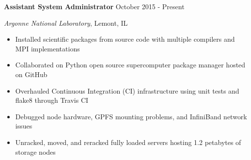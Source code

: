 

\textbf{Assistant System Administrator} \hfill October 2015 - Present

\textit{Argonne National Laboratory}, Lemont, IL

\begin{itemize}
    \item Installed scientific packages from source code with multiple compilers and MPI implementations
    \item Collaborated on Python open source supercomputer package manager hosted on GitHub
    \item Overhauled Continuous Integration (CI) infrastructure using unit tests and flake8 through Travis CI
    \item Debugged node hardware, GPFS mounting problems, and InfiniBand network issues
    \item Unracked, moved, and reracked fully loaded servers hosting 1.2 petabytes of storage nodes
\end{itemize}
